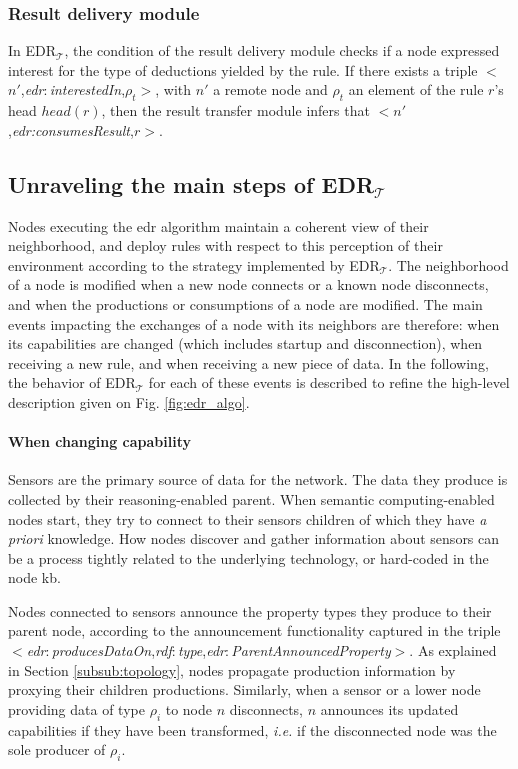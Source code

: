 \documentclass{iosart2c}
\newcommand{\edrt}{EDR$_{\mathcal{T}}$\xspace}
\newcommand{\namespace}[1]{\textit{#1$:$}}
\newcommand{\concept}[2]{\namespace{#1}\-\textit{#2}}
\newcommand{\triplet}[3]{$<$#1,\textit{#2},#3$>$}
\begin{document}
\subsubsection{Result delivery module}

In \edrt, the condition of the result delivery module checks if a node expressed interest for the type of deductions yielded by the rule. 
If there exists a triple \triplet{$n'$}{\concept{edr}{interest\-ed\-In}}{$\rho_t$}, with $n'$ a remote node and $\rho_t$ an element of the rule $r$'s head $head(r)$, then the result transfer module infers that \triplet{$n'$}{edr:consumes\-Result}{$r$}. 

\subsection{Unraveling the main steps of \edrt}
\label{subs:edrpt_algo}

Nodes executing the \gls{edr} algorithm maintain a coherent view of their neighborhood, and deploy rules with respect to this perception of their environment according to the strategy implemented by \edrt.
The neighborhood of a node is modified when a new node connects or a known node disconnects, and when the productions or consumptions of a node are modified.
The main events impacting the exchanges of a node with its neighbors are therefore: when its capabilities are changed (which includes startup and disconnection), when receiving a new rule, and when receiving a new piece of data.
In the following, the behavior of \edrt for each of these events is described to refine the high-level description given on Fig. \ref{fig:edr_algo}.

\paragraph{When changing capability}
\label{subsub:init}
Sensors are the primary source of data for the network. The data they produce is collected by their reasoning-enabled parent. 
When semantic computing-enabled nodes start, they try to connect to their sensors children of which they have \textit{a priori} knowledge.
How nodes discover and gather information about sensors can be a process tightly related to the underlying technology, or hard-coded in the node \gls{kb}.

Nodes connected to sensors announce the property types they produce to their parent node, according to the announcement functionality captured in the triple \triplet{\concept{edr}{produces\-Data\-On}}{\concept{rdf}{type}}{\concept{edr}{Parent\-Announced\-Property}}. 
As explained in Section \textsection \ref{subsub:topology}, nodes propagate production information by proxying their children productions.
Similarly, when a sensor or a lower node providing data of type $\rho_{i}$ to node $n$ disconnects, $n$ announces its updated capabilities if they have been transformed, \textit{i.e.} if the disconnected node was the sole producer of $\rho_{i}$.
\end{document}
